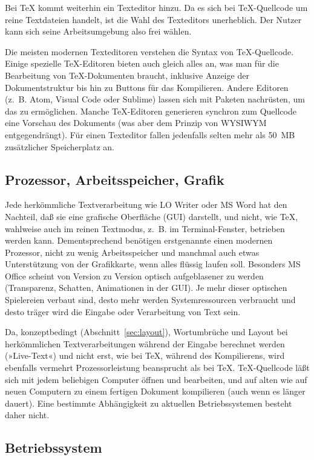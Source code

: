 \documentclass[11pt,a4paper,ngerman,DIV=8]{scrartcl}
\begin{document}
Bei \TeX{} kommt weiterhin ein Texteditor hinzu. Da es sich bei \TeX{}-Quellcode um reine Textdateien handelt, ist die Wahl des Texteditors unerheblich. Der Nutzer kann sich seine Arbeitsumgebung also frei wählen.

Die meisten modernen Texteditoren verstehen die Syntax von \TeX{}-Quellcode. Einige spezielle \TeX{}-Editoren bieten auch gleich alles an, was man für die Bearbeitung von \TeX{}-Dokumenten braucht, inklusive Anzeige der Dokumentstruktur bis hin zu Buttons für das Kompilieren. Andere Editoren (z.~B. Atom, Visual Code oder Sublime) lassen sich mit Paketen nachrüsten, um das zu ermöglichen. Manche \TeX{}-Editoren generieren synchron zum Quellcode eine Vorschau des Dokuments (was aber dem Prinzip von WYSIWYM entgegendrängt). Für einen Texteditor fallen jedenfalls selten mehr als 50~MB zusätzlicher Speicherplatz an.

\subsection{Prozessor, Arbeitsspeicher, Grafik}

Jede herkömmliche Textverarbeitung wie LO Writer oder MS Word hat den Nachteil, daß sie eine grafische Oberfläche (GUI) darstellt, und nicht, wie \TeX{}, wahlweise auch im reinen Textmodus, z.~B. im Terminal-Fenster, betrieben werden kann. Dementsprechend benötigen erstgenannte einen modernen Prozessor, nicht zu wenig Arbeitsspeicher und manchmal auch etwas Unterstützung von der Grafikkarte, wenn alles flüssig laufen soll. Besonders MS Office scheint von Version zu Version optisch aufgeblasener zu werden (Transparenz, Schatten, Animationen in der GUI). Je mehr dieser optischen Spielereien verbaut sind, desto mehr werden Systemressourcen verbraucht und desto träger wird die Eingabe oder Verarbeitung von Text sein.

Da, konzeptbedingt (Abschnitt~\ref{sec:layout}), Wortumbrüche und Layout bei herkömmlichen Textverarbeitungen während der Eingabe berechnet werden (»Live-Text«) und nicht erst, wie bei \TeX{}, während des Kompilierens, wird ebenfalls vermehrt Prozessorleistung beansprucht als bei \TeX{}.
\TeX{}-Quellcode läßt sich mit jedem beliebigen Computer öffnen und bearbeiten, und auf alten wie auf neuen Computern zu einem fertigen Dokument kompilieren (auch wenn es länger dauert). Eine bestimmte Abhängigkeit zu aktuellen Betriebssystemen besteht daher nicht.

\subsection{Betriebssystem}
\end{document}
